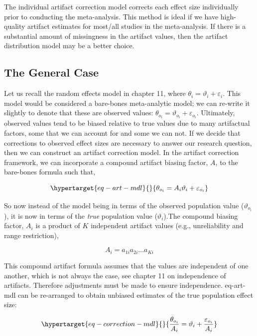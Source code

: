 \documentclass[
  letterpaper,
  DIV=11,
  numbers=noendperiod]{scrreprt}
\begin{document}
The individual artifact correction model corrects each effect size
individually prior to conducting the meta-analysis. This method is ideal
if we have high-quality artifact estimates for most/all studies in the
meta-analysis. If there is a substantial amount of missingness in the
artifact values, then the artifact distribution model may be a better
choice.

\hypertarget{the-general-case-2}{%
\subsection{The General Case}\label{the-general-case-2}}

Let us recall the random effects model in chapter 11, where
\(\theta_i=\vartheta_i+\varepsilon_i\). This model would be considered a
bare-bones meta-analytic model; we can re-write it slightly to denote
that these are observed values:
\(\theta_{o_i}=\vartheta_{o_i}+\varepsilon_{o_i}\). Ultimately, observed
values tend to be biased relative to true values due to many artifactual
factors, some that we can account for and some we can not. If we decide
that corrections to observed effect sizes are necessary to answer our
research question, then we can construct an artifact correction model.
In the artifact correction framework, we can incorporate a compound
artifact biasing factor, \(A\), to the bare-bones formula such that,

\begin{equation}\protect\hypertarget{eq-art-mdl}{}{
\theta_{o_i} = A_i\vartheta_i + \varepsilon_{o_i}
}\label{eq-art-mdl}\end{equation}

So now instead of the model being in terms of the observed population
value (\(\vartheta_{o_i}\)), it is now in terms of the \emph{true}
population value (\(\vartheta_{i}\)).The compound biasing factor,
\(A_i\) is a product of \(K\) independent artifact values (e.g.,
unreliability and range restriction),

\[
A_i = a_{1i} a_{2i} ... a_{Ki}
\]

This compound artifact formula assumes that the values are independent
of one another, which is not always the case, see chapter 11 on
independence of artifacts. Therefore adjustments must be made to ensure
independence. eq-art-mdl can be re-arranged to obtain unbiased estimates
of the true population effect size:

\begin{equation}\protect\hypertarget{eq-correction-mdl}{}{
\frac{\theta_{o_i}}{A_i} = \vartheta_i + \frac{\varepsilon_{o_i}}{A_i}
}\label{eq-correction-mdl}\end{equation}
\end{document}
